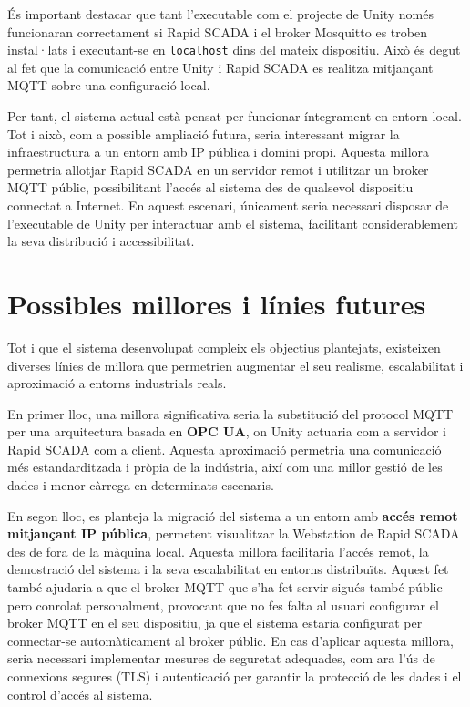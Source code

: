\documentclass[a4paper,11pt,DIV=13,headings=normal,abstract=true,twoside=semi]{article}
\begin{document}
És important destacar que tant l'executable com el projecte de Unity només funcionaran correctament si Rapid SCADA i el broker Mosquitto es troben instal·lats i executant-se en \texttt{localhost} dins del mateix dispositiu. Això és degut al fet que la comunicació entre Unity i Rapid SCADA es realitza mitjançant MQTT sobre una configuració local.

Per tant, el sistema actual està pensat per funcionar íntegrament en entorn local. Tot i això, com a possible ampliació futura, seria interessant migrar la infraestructura a un entorn amb IP pública i domini propi. Aquesta millora permetria allotjar Rapid SCADA en un servidor remot i utilitzar un broker MQTT públic, possibilitant l'accés al sistema des de qualsevol dispositiu connectat a Internet. En aquest escenari, únicament seria necessari disposar de l'executable de Unity per interactuar amb el sistema, facilitant considerablement la seva distribució i accessibilitat.

\newpage
\section{Possibles millores i línies futures}

Tot i que el sistema desenvolupat compleix els objectius plantejats, existeixen diverses línies de millora que permetrien augmentar el seu realisme, escalabilitat i aproximació a entorns industrials reals.

En primer lloc, una millora significativa seria la substitució del protocol MQTT per una arquitectura basada en \textbf{OPC UA}, on Unity actuaria com a servidor i Rapid SCADA com a client. Aquesta aproximació permetria una comunicació més estandarditzada i pròpia de la indústria, així com una millor gestió de les dades i menor càrrega en determinats escenaris.

En segon lloc, es planteja la migració del sistema a un entorn amb \textbf{accés remot mitjançant IP pública}, permetent visualitzar la Webstation de Rapid SCADA des de fora de la màquina local. Aquesta millora facilitaria l'accés remot, la demostració del sistema i la seva escalabilitat en entorns distribuïts. Aquest fet també ajudaria a que el broker MQTT que s'ha fet servir sigués també públic pero conrolat personalment, provocant que no fes falta al usuari configurar el broker MQTT en el seu dispositiu, ja que el sistema estaria configurat per connectar-se automàticament al broker públic. En cas d'aplicar aquesta millora, seria necessari implementar mesures de seguretat adequades, com ara l'ús de connexions segures (TLS) i autenticació per garantir la protecció de les dades i el control d'accés al sistema.
\end{document}
